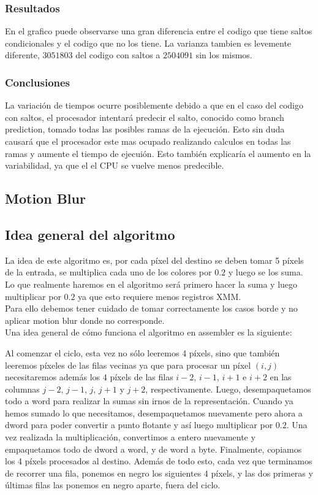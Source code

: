 \documentclass[a4paper]{article}
\begin{document}
\subsubsection{Resultados}
En el grafico puede observarse una gran diferencia entre el codigo que tiene saltos condicionales y el codigo que no los tiene. La varianza tambien es levemente diferente, $3051803$ del codigo con saltos a $2504091$ sin los mismos.

\subsubsection{Conclusiones}

La variación de tiempos ocurre posiblemente debido a que en el caso del codigo con saltos, el procesador intentará predecir el salto, conocido como branch prediction, tomado todas las posibles ramas de la ejecución. Esto sin duda causará que el procesador este mas ocupado realizando calculos en todas las ramas y aumente el tiempo de ejecuión. Esto también explicaría el aumento en la variabilidad, ya que el el CPU se vuelve menos predecible.

\newpage
\subsection{Motion Blur}
\subsection{Idea general del algoritmo}
La idea de este algoritmo es, por cada píxel del destino se deben tomar 5 píxels de la entrada, se multiplica cada uno de los colores por $0.2$ y luego se los suma. Lo que realmente haremos en el algoritmo será primero hacer la suma y luego multiplicar por $0.2$ ya que esto requiere menos registros XMM.
\\
Para ello debemos tener cuidado de tomar correctamente los casos borde y no aplicar motion blur donde no corresponde.
\\
Una idea general de cómo funciona el algoritmo en assembler es la siguiente:

Al comenzar el ciclo, esta vez no sólo leeremos 4 píxels, sino que también leeremos píxeles de las filas vecinas ya que para procesar un píxel $(i,j)$ necesitaremos además los 4 píxels de las filas $i-2$, $i-1$, $i+1$ e $i+2$ en las columnas $j-2$, $j-1$, $j$, $j+1$ y $j+2$, respectivamente. Luego, desempaquetamos todo a word para realizar la sumas sin irnos de la representación. Cuando ya hemos sumado lo que necesitamos, desempaquetamos nuevamente pero ahora a dword para poder convertir a punto flotante y así luego multiplicar por $0.2$. Una vez realizada la multiplicación, convertimos a entero nuevamente y empaquetamos todo de dword a word, y de word a byte. Finalmente, copiamos los 4 píxels procesados al destino. Además de todo esto, cada vez que terminamos de recorrer una fila, ponemos en negro los siguientes 4 píxels, y las dos primeras y últimas filas las ponemos en negro aparte, fuera del ciclo.
\end{document}
